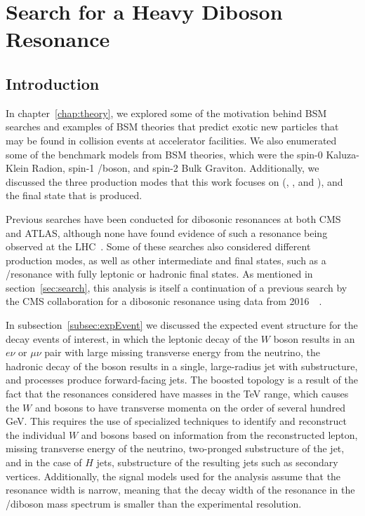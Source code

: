 
\chapter{Search for a Heavy Diboson Resonance}
\label{chap:analysis}

\section{Introduction}

In chapter~\ref{chap:theory}, we explored some of the motivation behind BSM searches and examples of BSM theories that predict exotic new particles that may be found in collision events at accelerator facilities.
We also enumerated some of the benchmark models from BSM theories, which were the spin-0 Kaluza-Klein Radion, spin-1 \Wpr/\Zpr boson, and spin-2 Bulk Graviton.
Additionally, we discussed the three production modes that this work focuses on (\VBF, \ggF, and \DY), and the final state that is produced.

Previous searches have been conducted for dibosonic resonances at both CMS and ATLAS, although none have found evidence of such a resonance being observed at the LHC~\cite{Aaboud_18,Aaboud_18_2,Aad_15,Khachatryan_14,Sirunyan_17,Sirunyan_17_2,atlas20}.
Some of these searches also considered different production modes, as well as other intermediate and final states, such as a \ZZ/\ZH resonance with fully leptonic or hadronic final states.
As mentioned in section~\ref{sec:search}, this analysis is itself a continuation of a previous search by the CMS collaboration for a dibosonic resonance using data from 2016~~\cite{Sirunyan_18}.

In subsection~\ref{subsec:expEvent} we discussed the expected event structure for the decay events of interest, in which the leptonic decay of the $W$ boson results in an $e\nu$ or $\mu\nu$ pair with large missing transverse energy from the neutrino, the hadronic decay of the \VorH boson results in a single, large-radius jet with substructure, and \VBF processes produce forward-facing jets.
The boosted topology is a result of the fact that the resonances considered have masses in the TeV range, which causes the $W$ and \VorH bosons to have transverse momenta on the order of several hundred GeV.
This requires the use of specialized techniques to identify and reconstruct the individual $W$ and \VorH bosons based on information from the reconstructed lepton, missing transverse energy of the neutrino, two-pronged substructure of the jet, and in the case of $H$ jets, substructure of the resulting \bbbar jets such as secondary vertices.
Additionally, the signal models used for the analysis assume that the resonance width is narrow, meaning that the decay width of the resonance in the \WV/\WH diboson mass spectrum is smaller than the experimental resolution.

